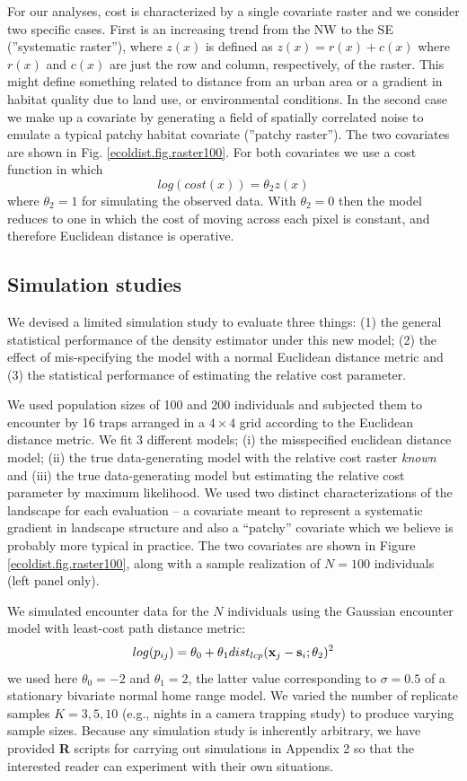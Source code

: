 \documentclass[12pt]{article}
\begin{document}
For our analyses, cost is characterized by a
single covariate raster and we consider two specific cases. First is an
increasing trend from the NW to the SE (''systematic raster''), where $z(x)$ is defined as
$z(x) = r(x) + c(x)$ where $r(x)$ and $c(x)$ are just the row and
column, respectively, of the raster.  This might define something
related to distance from an urban area or a gradient in habitat
quality due to land use, or environmental conditions.  In the second
case we make up a covariate by generating a field of spatially
correlated noise to emulate a typical patchy habitat covariate (''patchy raster''). The
two covariates are shown in Fig. \ref{ecoldist.fig.raster100}. For
both covariates we use a cost function in which
\[
 log(cost(x))=  \theta_2 z(x)
\]
where $\theta_2 = 1$ for simulating the observed data.
 With $\theta_2=0$ then the
model reduces to one in which the cost of moving across each pixel is
constant, and therefore Euclidean distance is operative.

\subsection{Simulation studies}

We devised a limited simulation study to evaluate three things: (1)
the general statistical performance of the density estimator under
this new model; (2) the effect of mis-specifying the model with a
normal Euclidean distance metric and (3) the statistical performance
of estimating the relative cost parameter.

We used population sizes of 100 and 200 individuals and subjected them
to encounter by 16 traps arranged in a $4\times 4$ grid according to
the Euclidean distance metric. We fit 3 different models; (i) the
misspecified euclidean distance model; (ii) the true data-generating
model with the relative cost raster {\it known} and (iii) the true
data-generating model but estimating the relative cost parameter by
maximum likelihood.  We used two distinct characterizations of the
landscape for each evaluation -- a covariate meant to represent a
systematic gradient in landscape structure and also a ``patchy''
covariate which we believe is probably more typical in practice. The
two covariates are shown in Figure \ref{ecoldist.fig.raster100}, along
with a sample realization of $N=100$ individuals (left panel only).

We simulated encounter data for the $N$ individuals using the Gaussian
encounter model with least-cost path distance metric:
\[
log(p_{ij})= \theta_{0} + \theta_{1} dist_{lcp}({\bf x}_{j} - {\bf
  s}_{i}; \theta_{2})^{2}
\]
we used here $\theta_{0} = -2$ and $\theta_{1} = 2$, the latter value
corresponding to $\sigma = 0.5$ of a stationary bivariate normal home
range model.  We varied the number of replicate samples $K=3,5,10$
(e.g., nights in a camera trapping study) to produce varying sample
sizes.  Because any simulation study is inherently arbitrary, we have
provided {\bf R} scripts for carrying out simulations in Appendix 2 so
that the interested reader can experiment with their own situations.
\end{document}

